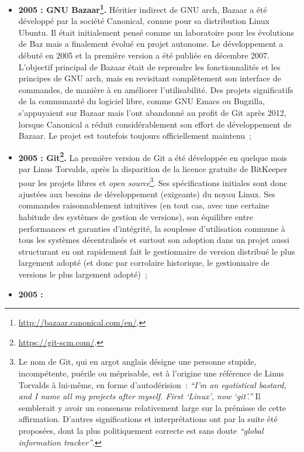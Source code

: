 \begin{itemize}
\item \textbf{2005 : GNU
    Bazaar\footnote{\url{http://bazaar.canonical.com/en/}.}.} Héritier indirect de GNU arch, Bazaar a été développé par
  la société Canonical, connue pour sa distribution Linux Ubuntu. Il
  était initialement pensé comme un laboratoire pour les évolutions de
  Baz mais a finalement évolué en projet autonome. Le développement a
  débuté en 2005 et la première version a été publiée en décembre
  2007. L'objectif principal de Bazaar était de reprendre les
  fonctionnalités et les principes de GNU arch, mais en revisitant
  complètement son interface de commandes, de manière à en améliorer
  l'utilisabilité. Des projets significatifs de la communauté du
  logiciel libre, comme GNU Emacs ou Bugzilla, s'appuyaient sur Bazaar
  mais l'ont abandonné au profit de Git après 2012, lorsque Canonical
  a réduit considérablement son effort de développement de Bazaar. Le
  projet est toutefois toujours officiellement maintenu~;
\item \textbf{2005 :
    Git\footnote{\url{https://git-scm.com/}.}.} La première
  version de Git a été développée en quelque mois par Linus Torvalds,
  après la disparition de la licence gratuite de BitKeeper pour les
  projets libres et \textit{open source}\footnote{Le nom de Git, qui
    en argot anglais désigne une personne stupide, incompétente,
    puérile ou méprisable, est à l'origine une référence de Linus
    Torvalds à lui-même, en forme d'autodérision~: \textit{``I'm an
      egotistical bastard, and I name all my projects after
      myself. First `Linux', now `git'.''} Il semblerait y avoir un
    consensus relativement large sur la prémisse de cette
    affirmation. D'autres significations et interprétations ont par la
    suite été proposées, dont la plus politiquement correcte est sans
    doute \textit{``global information tracker''}.}. Ses
  spécifications initiales sont donc ajustées aux besoins de
  développement (exigeants) du noyau Linux. Ses commandes
  raisonnablement intuitives (en tout cas, avec une certaine habitude
  des systèmes de gestion de versions), son équilibre entre
  performances et garanties d'intégrité, la souplesse d'utilisation
  commune à tous les systèmes décentralisés et surtout son adoption
  dans un projet aussi structurant en ont rapidement fait le
  gestionnaire de version distribué le plus largement adopté (et donc
  par corrolaire historique, le gestionnaire de versions le plus
  largement adopté)~;
\item \textbf{2005 :
}
\end{itemize}
